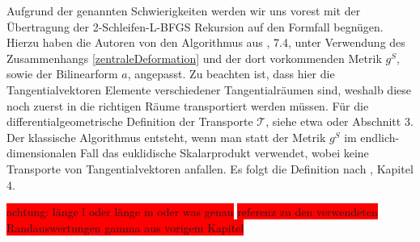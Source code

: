 Aufgrund der genannten Schwierigkeiten werden wir uns vorest mit der Übertragung der 2-Schleifen-L-BFGS Rekursion auf den Formfall begnügen. Hierzu haben die Autoren von \cite{bfgs1} den Algorithmus aus \cite{Nocedal}, 7.4, unter Verwendung des Zusammenhangs \ref{zentraleDeformation} und der dort vorkommenden Metrik $g^S$, sowie der Bilinearform $a$, angepasst. Zu beachten ist, dass hier die Tangentialvektoren Elemente verschiedener Tangentialräumen sind, weshalb diese noch zuerst in die richtigen Räume transportiert werden müssen. Für die differentialgeometrische Definition der Transporte $\mathcal{T}$, siehe etwa \cite{LeeDGEO} oder \cite{diffusion} Abschnitt 3. Der klassische Algorithmus entsteht, wenn man statt der Metrik $g^S$ im endlich-dimensionalen Fall das euklidische Skalarprodukt verwendet, wobei keine Transporte von Tangentialvektoren anfallen. Es folgt die Definition nach \cite{bfgs1}, Kapitel 4.

\colorbox{red}{ achtung: länge l oder länge m oder was genau}
\colorbox{red}{referenz zu den verwendeten Randauswertungen gamma aus vorigem Kapitel}

